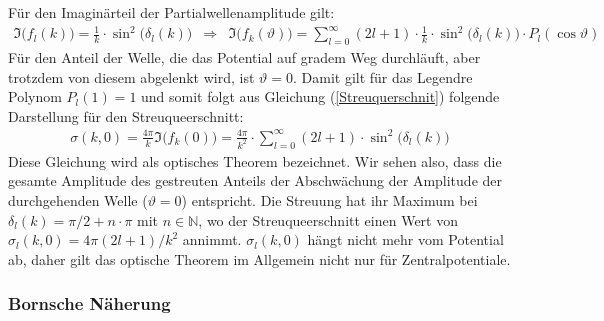 Für den Imaginärteil der Partialwellenamplitude gilt:
\begin{eqnarray*}
	\Im\big(f_l(k)\big) = \frac{1}{k}\cdot\sin^2\big(\delta_l(k)\big) &\Rightarrow& \Im\big(f_k(\vartheta)\big) = \sum_{l = 0}^{\infty} (2l+1)\cdot \frac{1}{k}\cdot\sin^2\big(\delta_l(k)\big)\cdot P_l(\cos\vartheta)
\end{eqnarray*}
Für den Anteil der Welle, die das Potential auf gradem Weg durchläuft, aber trotzdem von diesem abgelenkt wird, ist $\vartheta=0$. Damit gilt für das Legendre Polynom $P_l(1) = 1$ und somit folgt aus Gleichung (\ref{Streuquerschnit}) folgende Darstellung für den Streuqueerschnitt:
\begin{eqnarray}
	\sigma(k,0) = \frac{4\pi}{k} \Im\big(f_k(0)\big) = \frac{4\pi}{k^2}\cdot\sum_{l=0}^{\infty}(2l+1)\cdot\sin^2\big(\delta_l(k)\big) \label{OptischesTheorem}
\end{eqnarray}
Diese Gleichung wird als optisches Theorem bezeichnet. Wir sehen also, dass die gesamte Amplitude des gestreuten Anteils der Abschwächung der Amplitude der durchgehenden Welle ($\vartheta = 0$) entspricht. Die Streuung hat ihr Maximum bei $\delta_l(k)=\pi/2+n\cdot\pi$ mit $n\in\mathbb{N}$, wo der Streuqueerschnitt einen Wert von $\sigma_l(k,0)=4\pi(2l+1)/k^2$ annimmt. $\sigma_l(k,0)$ hängt nicht mehr vom Potential ab, daher gilt das optische Theorem im Allgemein nicht nur für Zentralpotentiale. 



\subsubsection{Bornsche Näherung}

